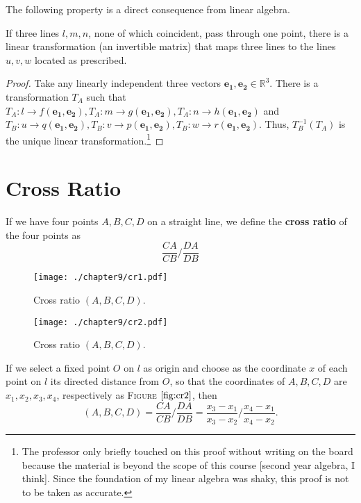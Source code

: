 The following property is a direct consequence from linear algebra. 
\begin{theorem}
If three lines $l,m,n$, none of which coincident, pass through one point, there is a linear transformation (an invertible matrix) that maps three lines to the lines $u,v,w$ located as prescribed.

\begin{proof}
Take any linearly independent three vectors $\mathbf{ e_{1}, e_{2}} \in \mathbb{R}^{3}$. 
There is a transformation 
$T_{A}$ 
such that 
$T_{A}: l \rightarrow f(\mathbf{e_{1}},\mathbf{ e_{2}}), T_{A}: m \rightarrow g(\mathbf{e_{1}},\mathbf{ e_{2}}) ,T_{A}: n \rightarrow h(\mathbf{e_{1}},\mathbf{ e_{2}})$ and 
$T_{B}: u \rightarrow q(\mathbf{e_{1}},\mathbf{ e_{2}}) , T_{B}: v \rightarrow p(\mathbf{e_{1}},\mathbf{ e_{2}}) , T_{B}: w\rightarrow r(\mathbf{e_{1}},\mathbf{ e_{2}}) $. Thus, $T_{B}^{-1}( T_{A})$ is the unique linear transformation.\footnote{The professor only briefly touched on this proof without writing on the board because the material is beyond the scope of this course [second year algebra, I think]. Since the foundation of my linear algebra was shaky, this proof is not to be taken as accurate. } \end{proof}
\end{theorem}
%





\section{Cross Ratio}
\begin{definition}
If we have four points $A,B,C,D$ on a straight line, we define the \textbf{cross ratio} of the four points as \[\frac{CA}{CB} /\frac{DA}{DB}\]
\begin{figure}[htbp] %
\centering
\texttt{[image: ./chapter9/cr1.pdf]} 
\caption{Cross ratio $(A,B,C,D)$.} 
\label{fig:cr1}
\end{figure}
\end{definition}
\begin{figure}[htbp] %
\centering
\texttt{[image: ./chapter9/cr2.pdf]} 
\caption{Cross ratio $(A,B,C,D)$.} 
\label{fig:cr2}
\end{figure}
If we select a fixed point $O$ on $l$ as origin and choose as the coordinate $x$ of each point on $l$ its directed distance from $O$, so that the coordinates of $A,B,C,D$ are $x_{1}, x_{2}, x_{3},x_{4}$, respectively as \textsc{Figure $\ref{fig:cr2}$}, then \[(A,B,C,D)=\frac{CA}{CB} /\frac{DA}{DB}=\frac{ x_{3}- x_{1}}{x_{3}- x_{2}} /\frac{x_{4}- x_{1}}{x_{4}-x_{2}}. \]

